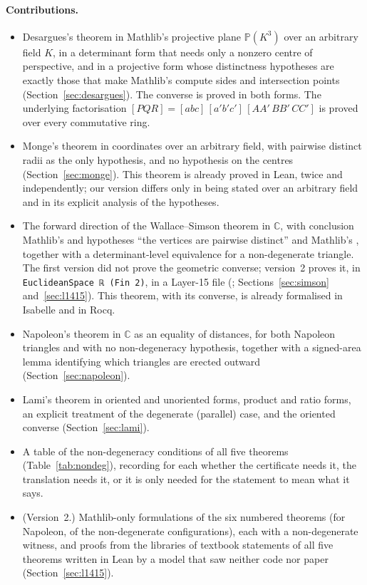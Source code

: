 \documentclass[11pt]{article}
\theoremstyle{definition}
\theoremstyle{remark}
\newcommand{\lean}[1]{\texttt{#1}}
\newcommand{\CC}{\mathbb{C}}
\newcommand{\PP}{\mathbb{P}}
\begin{document}
\paragraph{Contributions.}
\begin{itemize}
\item Desargues's theorem in Mathlib's projective plane $\PP(K^3)$ over an arbitrary field $K$,
in a determinant form that needs only a nonzero centre of perspective, and in a projective form
whose distinctness hypotheses are exactly those that make Mathlib's  compute sides
and intersection points (Section~\ref{sec:desargues}). The converse is proved in both forms. The
underlying factorisation $[PQR]=[abc]\,[a'b'c']\,[AA'\,BB'\,CC']$ is proved over every
commutative ring.
\item Monge's theorem in coordinates over an arbitrary field, with pairwise distinct radii as the
only hypothesis, and no hypothesis on the centres (Section~\ref{sec:monge}). This theorem is
already proved in Lean, twice and independently; our version differs only in being stated over an
arbitrary field and in its explicit analysis of the hypotheses.
\item The forward direction of the Wallace--Simson theorem in $\CC$, with conclusion Mathlib's
 and hypotheses ``the vertices are pairwise distinct'' and Mathlib's
, together with a determinant-level equivalence for a
non-degenerate triangle. The first version did not prove the geometric converse; version~2 proves
it, in \lean{EuclideanSpace ℝ (Fin 2)}, in a Layer-15 file (;
Sections~\ref{sec:simson} and~\ref{sec:l1415}). This
theorem, with its converse, is already formalised in Isabelle and in Rocq.
\item Napoleon's theorem in $\CC$ as an equality of distances, for both Napoleon triangles and
with no non-degeneracy hypothesis, together with a signed-area lemma identifying which triangles
are erected outward (Section~\ref{sec:napoleon}).
\item Lami's theorem in oriented and unoriented forms, product and ratio forms, an explicit
treatment of the degenerate (parallel) case, and the oriented converse
(Section~\ref{sec:lami}).
\item A table of the non-degeneracy conditions of all five theorems
(Table~\ref{tab:nondeg}), recording for each whether the certificate needs it, the translation
needs it, or it is only needed for the statement to mean what it says.
\item (Version~2.) Mathlib-only formulations of the six numbered theorems (for Napoleon, of the
non-degenerate configurations), each with a non-degenerate witness, and proofs from the libraries of textbook statements of all five theorems
written in Lean by a model that saw neither code nor paper (Section~\ref{sec:l1415}).
\end{itemize}
\end{document}
